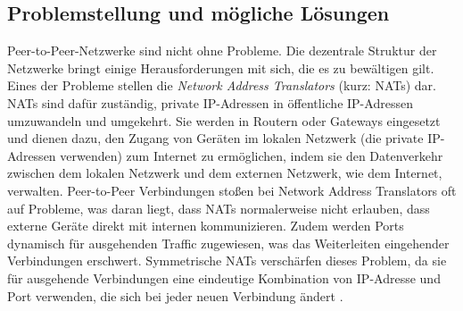 \subsection{Problemstellung und mögliche Lösungen}
\label{subsec:problemstellung_und_moegliche_loesungen}

Peer-to-Peer-Netzwerke sind nicht ohne Probleme. Die dezentrale Struktur der Netzwerke bringt einige Herausforderungen mit sich, die es zu bewältigen gilt. Eines der Probleme stellen die \textit{Network Address Translators} (kurz: NATs) dar. NATs sind dafür zuständig, private IP-Adressen in öffentliche IP-Adressen umzuwandeln und umgekehrt. Sie werden in Routern oder Gateways eingesetzt und dienen dazu, den Zugang von Geräten im lokalen Netzwerk (die private IP-Adressen verwenden) zum Internet zu ermöglichen, indem sie den Datenverkehr zwischen dem lokalen Netzwerk und dem externen Netzwerk, wie dem Internet, verwalten. Peer-to-Peer Verbindungen stoßen bei Network Address Translators oft auf Probleme, was daran liegt, dass NATs normalerweise nicht erlauben, dass externe Geräte direkt mit internen kommunizieren. Zudem werden Ports dynamisch für ausgehenden Traffic zugewiesen, was das Weiterleiten eingehender Verbindungen erschwert. Symmetrische NATs verschärfen dieses Problem, da sie für ausgehende Verbindungen eine eindeutige Kombination von IP-Adresse und Port verwenden, die sich bei jeder neuen Verbindung ändert \Parencite[S. 1-9]{rfc2663_NAT_Terminology}.

